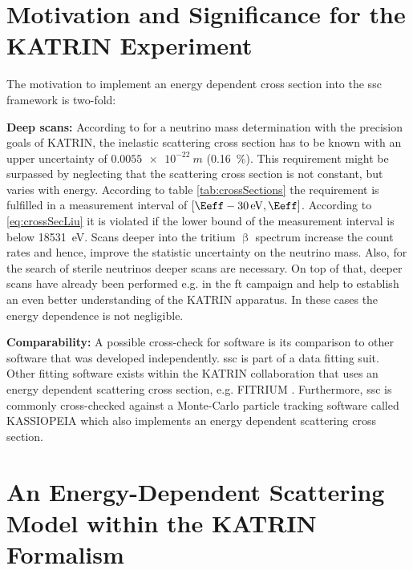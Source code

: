 \section{Motivation and Significance for the KATRIN Experiment}
The motivation to implement an energy dependent cross section into the \gls{ssc} framework is two-fold:
\par{\textbf{Deep scans:} According to \cite{Groh2015} for a neutrino mass determination with the precision goals of KATRIN, the inelastic scattering cross section has to be known with an upper uncertainty of $\SI{0.0055e-22}{m}$ (\SI{0.16}{\percent}). This requirement might be surpassed by neglecting that the scattering cross section is not constant, but varies with energy. According to table \ref{tab:crossSections} the requirement is fulfilled in a measurement interval of $[\Eeff-\SI{30}{eV}, \Eeff]$. According to \eqref{eq:crossSecLiu} it is violated if the lower bound of the measurement interval is below \SI{18531}{eV}. Scans deeper into the tritium $\upbeta$ spectrum increase the count rates and hence, improve the statistic uncertainty on the neutrino mass. Also, for the search of sterile neutrinos deeper scans are necessary. On top of that, deeper scans have already been performed e.g. in the \gls{ft} campaign and help to establish an even better understanding of the KATRIN apparatus. In these cases the energy dependence is not negligible.}
\par{\textbf{Comparability:} A possible cross-check for software is its comparison to other software that was developed independently. \gls{ssc} is part of a data fitting suit. Other fitting software exists within the KATRIN collaboration that uses an energy dependent scattering cross section, e.g. FITRIUM \cite{Fitrium}. Furthermore, \gls{ssc} is commonly cross-checked against a Monte-Carlo particle tracking software called KASSIOPEIA \cite{KATRINCOL2019} which also implements an energy dependent scattering cross section.}
    
\section{An Energy-Dependent Scattering Model within the KATRIN Formalism}
\label{sec:energyDepScatProbsModel}
